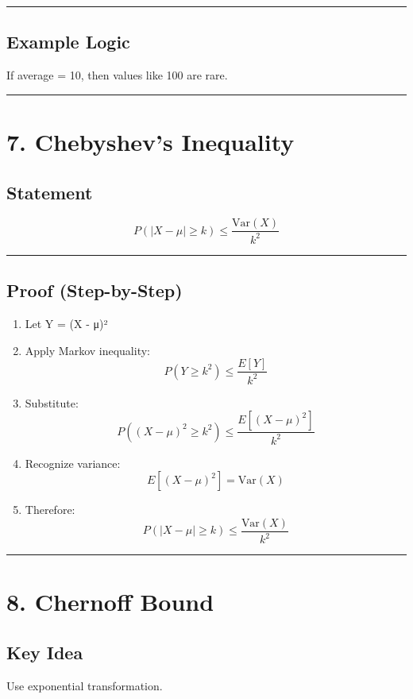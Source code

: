 \documentclass[12pt]{article}
\begin{document}
\hrule

\subsection*{Example Logic}

If average = 10, then values like 100 are rare.

\hrule

\section*{7. Chebyshev’s Inequality}

\subsection*{Statement}

\[
P(|X - \mu| \geq k) \leq \frac{\text{Var}(X)}{k^2}
\]

\hrule

\subsection*{Proof (Step-by-Step)}

\begin{enumerate}
\item Let Y = (X - μ)²

\item Apply Markov inequality:
\[
P(Y \geq k^2) \leq \frac{E[Y]}{k^2}
\]

\item Substitute:
\[
P((X - \mu)^2 \geq k^2) \leq \frac{E[(X - \mu)^2]}{k^2}
\]

\item Recognize variance:
\[
E[(X - \mu)^2] = \text{Var}(X)
\]

\item Therefore:
\[
P(|X - \mu| \geq k) \leq \frac{\text{Var}(X)}{k^2}
\]
\end{enumerate}

\hrule

\section*{8. Chernoff Bound}

\subsection*{Key Idea}

Use exponential transformation.
\end{document}
